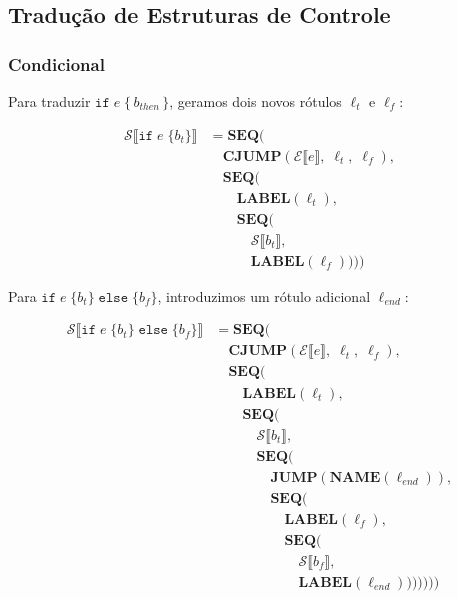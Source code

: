 \subsection{Tradução de Estruturas de Controle}\label{sec:sdt-control}

\subsubsection*{Condicional}

Para traduzir $\mathtt{if}\; e\; \{\, b_{\mathit{then}} \,\}$,
geramos dois novos rótulos $\ell_t$ e $\ell_f$:

\[
  \begin{aligned}
    \mathcal{S}\llbracket \mathtt{if}\; e\; \{b_t\} \rrbracket
    &= \mathbf{SEQ}( \\
      &\quad \mathbf{CJUMP}(\mathcal{E}\llbracket e \rrbracket,\;
      \ell_t,\; \ell_f), \\
      &\quad \mathbf{SEQ}( \\
        &\qquad \mathbf{LABEL}(\ell_t), \\
        &\qquad \mathbf{SEQ}( \\
          &\qquad\quad \mathcal{S}\llbracket b_t \rrbracket, \\
    &\qquad\quad \mathbf{LABEL}(\ell_f))))
  \end{aligned}
\]

Para $\mathtt{if}\; e\; \{b_t\}\; \mathtt{else}\; \{b_f\}$, introduzimos um
rótulo adicional $\ell_{\mathit{end}}$:

\[
  \begin{aligned}
    \mathcal{S}\llbracket \mathtt{if}\; e\; \{b_t\}\; \mathtt{else}\;
    \{b_f\} \rrbracket
    &= \mathbf{SEQ}( \\
      &\quad \mathbf{CJUMP}(\mathcal{E}\llbracket e \rrbracket,\;
      \ell_t,\; \ell_f), \\
      &\quad \mathbf{SEQ}( \\
        &\qquad \mathbf{LABEL}(\ell_t), \\
        &\qquad \mathbf{SEQ}( \\
          &\qquad\quad \mathcal{S}\llbracket b_t \rrbracket, \\
          &\qquad\quad \mathbf{SEQ}( \\
            &\qquad\qquad \mathbf{JUMP}(\mathbf{NAME}(\ell_{\mathit{end}})), \\
            &\qquad\qquad \mathbf{SEQ}( \\
              &\qquad\qquad\quad \mathbf{LABEL}(\ell_f), \\
              &\qquad\qquad\quad \mathbf{SEQ}( \\
                &\qquad\qquad\qquad \mathcal{S}\llbracket b_f \rrbracket, \\
    &\qquad\qquad\qquad \mathbf{LABEL}(\ell_{\mathit{end}})))))))
  \end{aligned}
\]

